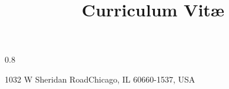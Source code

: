 

\renewcommand{\familydefault}{\sfdefault}         %




\usepackage{breakurl}

\usepackage[utf8]{inputenc}                       %

\usepackage[scale=0.75]{geometry}
\geometry{margin=0.75in}

\usepackage[maxbibnames=99,backend=biber,natbib=true,sorting=ydnt]{biblatex}
\usepackage{import}

\usepackage{etoolbox,changepage}
\patchcmd{\makehead}%
  {0.8\textwidth}%
  {\linewidth}%
  {}{}%
  
\title{Curriculum Vitæ}                               %
\address{Loyola University Chicago}{1032 W Sheridan Road}{Chicago, IL 60660-1537, USA}%
